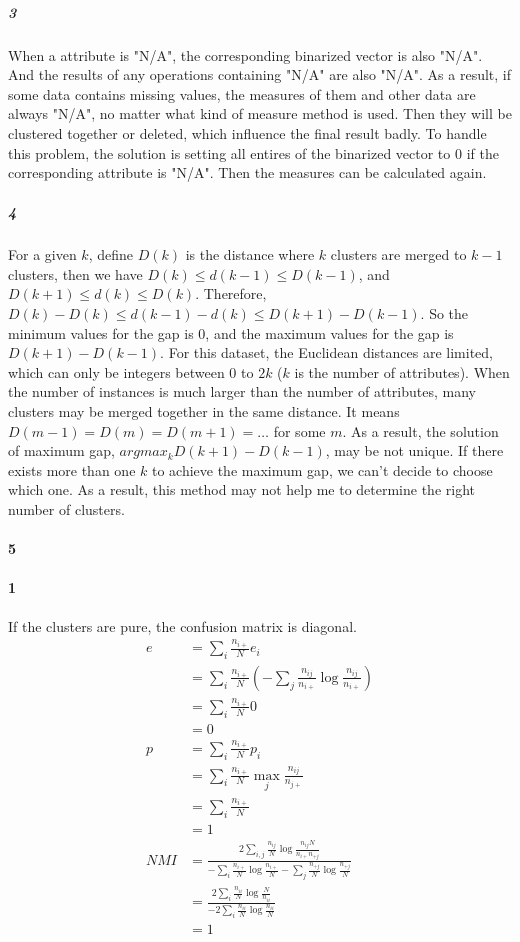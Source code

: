 \documentclass[22pt]{article}
\begin{document}
		\subparagraph{3} When a attribute is "N/A", the corresponding binarized vector is also "N/A". And the results of any operations containing "N/A" are also "N/A". As a result, if some data contains missing values, the measures of them and other data are always "N/A", no matter what kind of measure method is used. Then they will be clustered together or deleted, which influence the final result badly. To handle this problem, the solution is setting all entires of the binarized vector to 0 if the corresponding attribute is "N/A". Then the measures can be calculated again.

		\subparagraph{4} For a given $k$, define $D(k)$ is the distance where $k$ clusters are merged to $k-1$ clusters, then we have $D(k)\leq d(k-1) \leq D(k-1) $, and $D(k+1)\leq d(k) \leq D(k)$. Therefore, $D(k)-D(k)\leq d(k-1)-d(k)\leq D(k+1)-D(k-1)$. So the minimum values for the gap is 0, and the maximum values for the gap is $D(k+1)-D(k-1)$. For this dataset, the Euclidean distances are limited, which can only be integers between 0 to $2k$ ($k$ is the number of attributes). When the number of instances is much larger than the number of attributes, many clusters may be merged together in the same distance. It means $D(m-1) = D(m) = D(m+1) = \dots$ for some $m$. As a result, the solution of maximum gap, $argmax_k D(k+1)-D(k-1)$, may be not unique. If there exists more than one $k$ to achieve the maximum gap, we can't decide to choose which one. As a result, this method may not help me to determine the right number of clusters.


	\paragraph{5}
		\paragraph{1} If the clusters are pure, the confusion matrix is diagonal. 
		\begin{align}
			e & = \sum_i \frac{n_{i+}}{N}e_i\\
			& = \sum_i \frac{n_{i+}}{N} (-\sum_j\frac{n_{ij}}{n_{i+}}\log\frac{n_{ij}}{n_{i+}})\\
			& = \sum_i \frac{n_{i+}}{N} 0\\
			& = 0\\
			p & = \sum_i \frac{n_{i+}}{N}p_i\\
			& = \sum_i \frac{n_{i+}}{N} \max_j\frac{n_{ij}}{n_{j+}}\\
			& = \sum_i \frac{n_{i+}}{N} \\
			& = 1\\
			NMI & = \frac{2\sum_{i,j}\frac{n_{ij}}{N}\log\frac{n_{ij}N}{n_{i+}n_{+j}}}{-\sum_i\frac{n_{i+}}{N}\log\frac{n_{i+}}{N}-\sum_j\frac{n_{+j}}{N}\log\frac{n_{+j}}{N}}\\
			& = \frac{2\sum_{i}\frac{n_{ii}}{N}\log\frac{N}{n_{ii}}}{-2\sum_i\frac{n_{ii}}{N}\log\frac{n_{ii}}{N}}\\
			& = 1
		\end{align}
\end{document}
